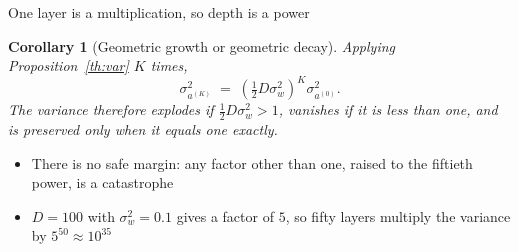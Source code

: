 \documentclass[aspectratio=169, 11pt]{beamer}
\newtheorem{corx}[theorem]{Corollary}
\newcommand{\src}[3]{}      %
\begin{document}
\begin{frame}{One layer is a multiplication, so depth is a power}
  \src{he2015}{equation}{9}
  \src{he2015}{section}{2.2}
  \src{prince2023}{section}{7.5}
  \vspace{-0.25em}
  \begin{corx}[Geometric growth or geometric decay]\label{th:geom}
    \small
    Applying Proposition~\ref{th:var} $K$ times,
    \[
      \sigma^2_{a^{(K)}} \;=\;
        \left(\tfrac12 D \sigma_w^2\right)^{K} \sigma^2_{a^{(0)}} .
    \]
    The variance therefore explodes if
    $\tfrac12 D \sigma_w^2 > 1$, vanishes if it is less than one, and is
    preserved only when it equals one exactly.
  \end{corx}
  \vspace{0.25em}
  \begin{itemize}\itemsep0.3em
    \item There is no safe margin: any factor other than one, raised to
          the fiftieth power, is a catastrophe
    \item $D = 100$ with $\sigma_w^2 = 0.1$ gives a factor of $5$, so
          fifty layers multiply the variance by $5^{50} \approx 10^{35}$
  \end{itemize}
\end{frame}
\end{document}

